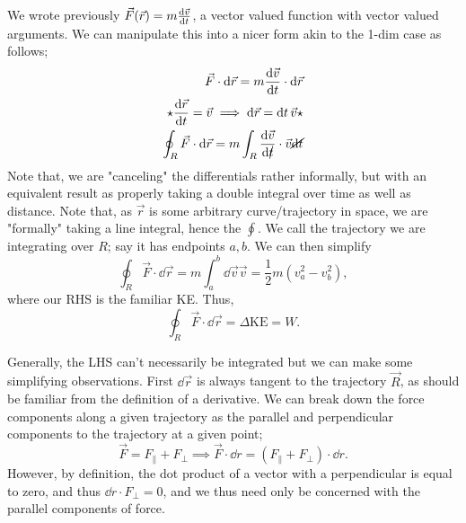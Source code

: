 \documentclass[12pt]{article}
\begin{document}
We wrote previously $\vec{F}(\vec{r}) = m \dv{\vec{v}}{t}$, a vector valued function with vector valued arguments. We can manipulate this into a nicer form akin to the 1-dim case as follows;
\begin{align*}
  \vec{F} \cdot \dd{\vec{r}} = m \dv{\vec{v}}{t} \cdot \dd{\vec{r}}\\
  \star \dv{\vec{r}}{t} = \vec{v} \implies \dd{\vec{r}} = \dd{t} \vec{v}\star\\
  \oint_R \vec{F} \cdot \dd{\vec{r}} = m \int_R\dv{\vec{v}}{\cancel{t}}\cdot \vec{v} \cancel{\dd{t}}
\end{align*}
Note that, we are "canceling" the differentials rather informally, but with an equivalent result as properly taking a double integral over time as well as distance. Note that, as $\vec{r}$ is some arbitrary curve/trajectory in space, we are "formally" taking a line integral, hence the $\oint$. We call the trajectory we are integrating over $R$; say it has endpoints $a,b$. We can then simplify\[
  \oint_R \vec{F} \cdot \dd{\vec{r}} = m \int_a^b \dd{\vec{v}} \vec{v} = \frac{1}{2}m \left(v_a^2 - v_b^2\right),\] where our RHS is the familiar KE. Thus, 
  \[\boxed{\oint_R \vec{F} \cdot \dd{\vec{r}} = \Delta \text{KE}} = W.\]

Generally, the LHS can't necessarily be integrated but we can make some simplifying observations. First $\dd{\vec{r}}$ is always tangent to the trajectory $\vec{R}$, as should be familiar from the definition of a derivative. We can break down the force components along a given trajectory as the parallel and perpendicular components to the trajectory at a given point; \[\vec{F} = F_{\parallel} + F_\perp \implies \vec{F} \cdot \dd{r} = (F_{\parallel} + F_\perp)\cdot \dd{r}.\] However, by definition, the dot product of a vector with a perpendicular is equal to zero, and thus $\dd{r} \cdot F_\perp = 0$, and we thus need only be concerned with the parallel components of force.
\end{document}
